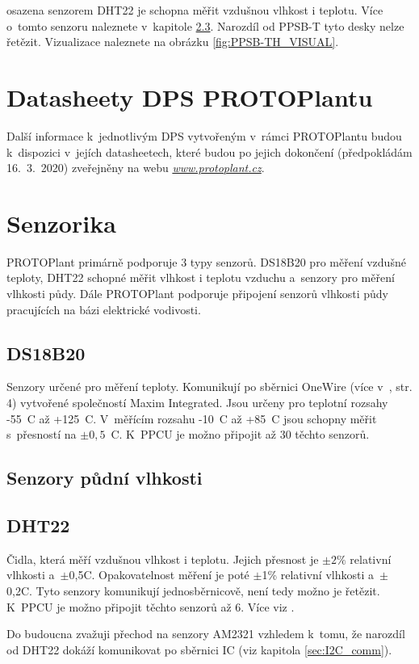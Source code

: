 \noindent{} osazena senzorem DHT22 \cite{DHT22} je schopna měřit vzdušnou vlhkost i teplotu.
Více o~tomto senzoru naleznete v~kapitole \ref{sec:DHT22}.
Narozdíl od PPSB-T tyto desky nelze řetězit.
Vizualizace naleznete na obrázku \ref{fig:PPSB-TH_VISUAL}.\newline

\section{Datasheety DPS PROTOPlantu}
\label{sec:DPS_datasheets}
Další informace k~jednotlivým DPS vytvořeným v~rámci PROTOPlantu budou k~dispozici v~jejích datasheetech, které budou po jejich dokončení (předpokládám 16.~3.~2020) zveřejněny na webu \textit{\url{www.protoplant.cz}}.

\section{Senzorika}
PROTOPlant primárně podporuje 3 typy senzorů. 
DS18B20 pro měření vzdušné teploty, DHT22 schopné měřit vlhkost i teplotu vzduchu a~senzory pro měření vlhkosti půdy.
Dále PROTOPlant podporuje připojení senzorů vlhkosti půdy pracujících na bázi elektrické vodivosti.

\subsection{DS18B20}
\label{sec:DS18B20}
Senzory určené pro měření teploty. 
Komunikují po sběrnici OneWire (více v~\cite{DS18B20}, str. 4) vytvořené společností Maxim Integrated.
Jsou určeny pro teplotní rozsahy -55~\degree C až +125~\degree C.
V~měřícím rozsahu -10~\degree C až +85~\degree C jsou schopny měřit s~přesností na $\pm0,5$~\degree C.
K~PPCU je možno připojit až 30 těchto senzorů.


\subsection{Senzory půdní vlhkosti}

\subsection{DHT22}
\label{sec:DHT22}
Čidla, která měří vzdušnou vlhkost i teplotu.
Jejich přesnost je $\pm2\%$ relativní vlhkosti a~$\pm$0,5\degree C.
Opakovatelnost měření je poté $\pm$1\% relativní vlhkosti a~$\pm$0,2\degree C.
Tyto senzory komunikují jednosběrnicově, není tedy možno je řetězit.
K~PPCU je možno připojit těchto senzorů až 6.
Více viz \cite{DHT22}.

Do budoucna zvažuji přechod na senzory AM2321 \cite{AM2321} vzhledem k~tomu, že narozdíl od DHT22 dokáží komunikovat po sběrnici IC (viz kapitola \ref{sec:I2C_comm}).

\newpage